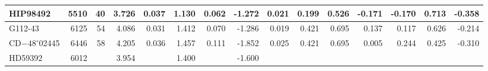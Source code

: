 \documentclass{aa}
\begin{document}
\begin{table}
\begin{tabular}{l*{14}{r}}
HIP98492        & 5510 &   40 &  3.726&  0.037&  1.130&  0.062& -1.272&  0.021&  0.199&  0.526& -0.171& -0.170&  0.713& -0.358 \\\hline
G112-43         & 6125 &   54 &  4.086&  0.031&  1.412&  0.070& -1.286&  0.019&  0.421&  0.695&  0.137&  0.117&  0.626& -0.214 \\
CD$-48^{\circ}$02445      & 6446 &   58 &  4.205&  0.036&  1.457&  0.111& -1.852&  0.025&  0.421&  0.695&  0.005&  0.244&  0.425& -0.310 \\
HD59392         & 6012 &      &  3.954&       &  1.400&       & -1.600&       &       &       &       &       &       &        \\
\hline
\end{tabular}
\end{table}
\end{document}
